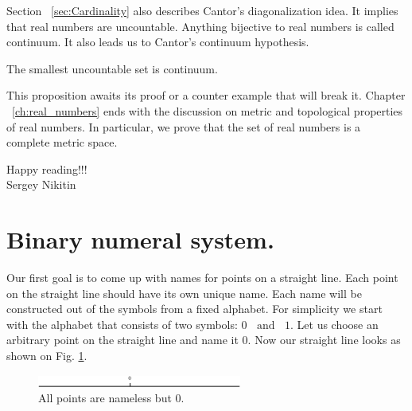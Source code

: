 \documentclass[color=black,11pt]{elegantpaper}
\begin{document}
Section ~\ref{sec:Cardinality} also describes Cantor's diagonalization idea. It implies that real numbers are uncountable. Anything bijective to real numbers is called continuum. It also leads us to Cantor's continuum hypothesis. 
\begin{center}
\begin{itshape}
The smallest uncountable set is continuum.
\end{itshape}
\end{center}
This proposition awaits its proof or a counter example that will break it. Chapter  ~\ref{ch:real_numbers} ends with the discussion on metric and topological properties of real numbers. In particular, we prove that the set of real numbers is a complete metric space.

Happy reading!!!\\
Sergey Nikitin 
 

\section{Binary numeral system.} 
\label{sec:binary}

Our first goal is to come up with names for points on a straight line. Each point on the straight line should have its own unique name. Each name will be constructed out of the symbols from a fixed alphabet. For simplicity we start with the alphabet that consists of two symbols: $0 \;\;\mbox{ and }\;\; 1.$ Let us choose an arbitrary point on the straight line and name it $0.$ Now our straight line looks as shown on Fig. \ref{fig:only_zero}. 

\begin{figure}[htbp]
  \centering
  \includegraphics[width=0.6\textwidth]{xfig_stuff/straight_line_with0.eps}
  \caption{All points are nameless but $0.$}
  \label{fig:only_zero}
\end{figure}
\end{document}
